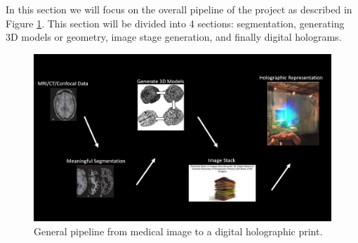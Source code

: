 
In this section we will focus on the overall pipeline of the project as described in Figure \ref{fig:pipeline}.  This section will be divided into 4 sections: segmentation, generating 3D models or geometry, image stage generation, and finally digital holograms. 

\begin{figure}[H]
  \centering
  \includegraphics[width=\linewidth]{img/pipeline.jpg}
  \caption{General pipeline from medical image to a digital holographic print.}
  \label{fig:pipeline}
\end{figure}



